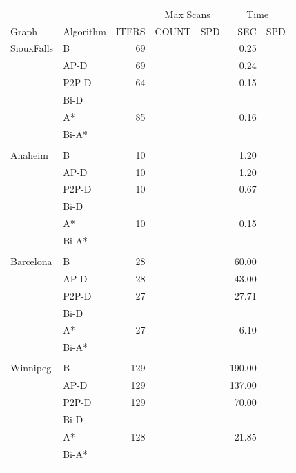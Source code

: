 \begin{table}[H]
    \centering
    \begin{tabular}{l l r rr rr } \toprule
        & & & \multicolumn{2}{c}{Max Scans} & \multicolumn{2}{c}{Time} \\ 
        \cmidrule(lr){4-5}
        \cmidrule(lr){6-7}
        Graph & Algorithm & ITERS & COUNT & SPD                     & SEC & SPD \\ 
        \cmidrule(lr){1-1}
        \cmidrule(lr){2-2}
        \cmidrule(lr){3-3}
        \cmidrule(lr){4-4}
        \cmidrule(lr){5-5}
        \cmidrule(lr){6-6}
        \cmidrule(lr){7-7}
        SiouxFalls    & B     & 69 & & & 0.25 & \\
        & AP-D  & 69 & & & 0.24 & \\
        & P2P-D & 64 & & & 0.15 & \\
        & Bi-D  & & & & & \\
        & A*    & 85 & & & 0.16 & \\
        & Bi-A* & & & & & \\ \\
        Anaheim       & B     & 10 & & & 1.20 & \\
        & AP-D  & 10 & & & 1.20 & \\
        & P2P-D & 10 & & & 0.67 & \\
        & Bi-D  & & & & & \\
        & A*    & 10 & & & 0.15 & \\
        & Bi-A* & & & & & \\ \\
        Barcelona     & B     & 28 & & & 60.00 & \\
        & AP-D  & 28 & & & 43.00 & \\
        & P2P-D & 27 & & & 27.71 & \\
        & Bi-D  & & & & & \\
        & A*    & 27 & & &  6.10 & \\
        & Bi-A* & & & & & \\ \\
        Winnipeg      & B     & 129 & & & 190.00 & \\
        & AP-D  & 129 & & & 137.00 & \\
        & P2P-D & 129 & & &  70.00 & \\
        & Bi-D  & & & & & \\
        & A*    & 128 & & & 21.85 & \\
        & Bi-A* & & & & & \\ \\

\end{tabular}
\end{table}
